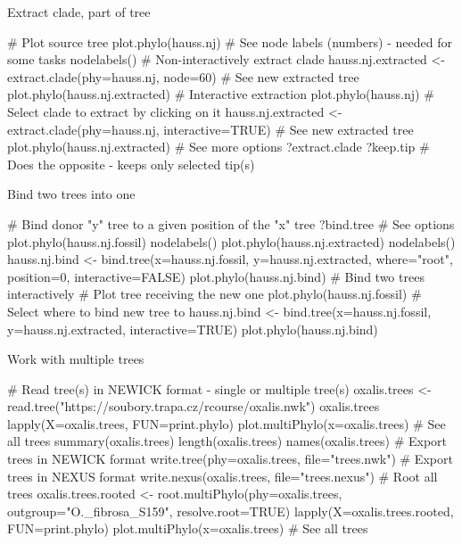 \documentclass[compress, ucs, xelatex, 11pt, xcolor=svgnames, aspectratio=169,
	hyperref={
		bookmarks=true,
		unicode=true,
		colorlinks=true,
		pdftitle={Molecular data in R},
		plainpages=false,
		pdfauthor={Vojtech Zeisek},
		pdfsubject={Course about phylogeny and evolution in R},
		pdfcreator={XeLaTeX},
		pdfkeywords={R, evolution, phylogeny, molecular data},
		linkcolor=Crimson, %
		anchorcolor=Magenta, %
		citecolor=Magenta, %
		filecolor=Magenta, %
		menucolor=Magenta, %
		urlcolor=DodgerBlue, %
		pdftex},
	url={hyphens, lowtilde} %
	]{beamer}
\begin{document}
\begin{frame}[fragile]{Extract clade, part of tree}
	\begin{spluscode}
    # Plot source tree
    plot.phylo(hauss.nj)
    # See node labels (numbers) - needed for some tasks
    nodelabels()
    # Non-interactively extract clade
    hauss.nj.extracted <- extract.clade(phy=hauss.nj, node=60)
    # See new extracted tree
    plot.phylo(hauss.nj.extracted)
    # Interactive extraction
    plot.phylo(hauss.nj)
    # Select clade to extract by clicking on it
    hauss.nj.extracted <- extract.clade(phy=hauss.nj, interactive=TRUE)
    # See new extracted tree
    plot.phylo(hauss.nj.extracted)
    # See more options
    ?extract.clade
    ?keep.tip # Does the opposite - keeps only selected tip(s)
	\end{spluscode}
\end{frame}

\begin{frame}[fragile]{Bind two trees into one}
	\begin{spluscode}
    # Bind donor "y" tree to a given position of the "x" tree
    ?bind.tree # See options
    plot.phylo(hauss.nj.fossil)
    nodelabels()
    plot.phylo(hauss.nj.extracted)
    nodelabels()
    hauss.nj.bind <- bind.tree(x=hauss.nj.fossil, y=hauss.nj.extracted,
      where="root", position=0, interactive=FALSE)
    plot.phylo(hauss.nj.bind)
    # Bind two trees interactively
    # Plot tree receiving the new one
    plot.phylo(hauss.nj.fossil)
    # Select where to bind new tree to
    hauss.nj.bind <- bind.tree(x=hauss.nj.fossil, y=hauss.nj.extracted,
      interactive=TRUE)
    plot.phylo(hauss.nj.bind)
	\end{spluscode}
\end{frame}

\begin{frame}[fragile]{Work with multiple trees}
	\begin{spluscode}
    # Read tree(s) in NEWICK format - single or multiple tree(s)
    oxalis.trees <- read.tree("https://soubory.trapa.cz/rcourse/oxalis.nwk")
    oxalis.trees
    lapply(X=oxalis.trees, FUN=print.phylo)
    plot.multiPhylo(x=oxalis.trees) # See all trees
    summary(oxalis.trees)
    length(oxalis.trees)
    names(oxalis.trees)
    # Export trees in NEWICK format
    write.tree(phy=oxalis.trees, file="trees.nwk")
    # Export trees in NEXUS format
    write.nexus(oxalis.trees, file="trees.nexus")
    # Root all trees
    oxalis.trees.rooted <- root.multiPhylo(phy=oxalis.trees,
      outgroup="O._fibrosa_S159", resolve.root=TRUE)
    lapply(X=oxalis.trees.rooted, FUN=print.phylo)
    plot.multiPhylo(x=oxalis.trees) # See all trees
	\end{spluscode}
\end{frame}
\end{document}
